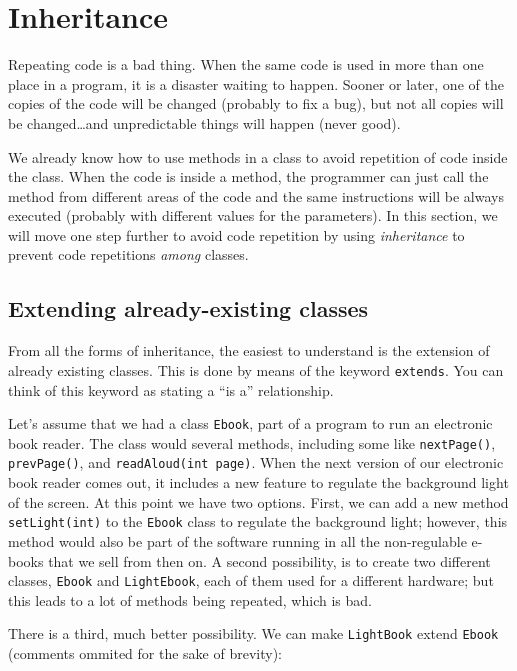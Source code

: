\section{Inheritance}
\label{sec:inheritance-1}

Repeating code is a bad thing. When the same code is used in more than
one place in a program, it is a disaster waiting to happen. Sooner or
later, one of the copies of the code will be changed (probably to fix
a bug), but not all copies will be changed\ldots and unpredictable things
will happen (never good). 

We already know how to use methods in a class to avoid repetition of
code inside the class. When the code is inside a method, the
programmer can just call the method from different areas of the code
and the same instructions will be always executed (probably with
different values for the parameters). In this section, we will move
one step further to avoid code repetition by using \emph{inheritance} to
prevent code repetitions \emph{among} classes. 

\subsection{Extending already-existing classes}
\label{sec:extend-alre-exist}

From all the forms of inheritance, the easiest to understand is the
extension of already existing classes. This is done by means of the
keyword \verb+extends+. You can think of this keyword as stating a
``is a'' relationship. 

Let's assume that we had a class \verb+Ebook+,
part of a program to run an electronic book reader. The class would
several methods, including some like \verb+nextPage()+,
\verb+prevPage()+, and \verb+readAloud(int page)+. When the next
version of our electronic book reader comes out, it includes a new
feature to regulate the background light of the screen. At this point
we have two options. First, we can add a new method
\verb+setLight(int)+ to the \verb+Ebook+ class to regulate the
background light; however, this method would also be part of the
software running in all the non-regulable e-books that we sell from
then on. A second possibility, is to create two different classes,
\verb+Ebook+ and \verb+LightEbook+, each of them used for a different
hardware; but this leads to a lot of methods being repeated, which is
bad. 

There is a third, much better possibility. We can make
\verb+LightBook+ extend \verb+Ebook+ (comments ommited for the sake of
brevity): 

